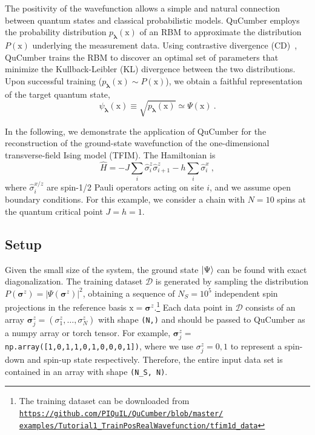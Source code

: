 \documentclass[submission, Phys, hidelnks]{SciPost}
\newcommand{\x}{\bm{\mathrm{x}}}
\begin{document}
The positivity of the wavefunction allows a simple and natural connection
between quantum states and classical probabilistic models. QuCumber employs the
probability distribution $p_{\bm{\lambda}}(\x)$ of an RBM to approximate the
distribution $P(\x)$ underlying the measurement data. Using contrastive
divergence (CD)~\cite{hinton_training_2002}, QuCumber trains the RBM to discover
an optimal set of parameters that minimize the Kullback-Leibler (KL) divergence
between the two distributions. Upon successful training
($p_{\bm{\lambda}}(\x)\sim P(\x)$), we obtain a faithful representation of
the target quantum state,
\begin{equation}\label{wfpd}
    \psi_{\bm{\lambda}}(\x) \equiv \sqrt{p_{\bm{\lambda}}(\x)}
    \simeq\Psi(\x)\:.
\end{equation}

In the following, we demonstrate the application of QuCumber for the reconstruction of the
ground-state wavefunction of the one-dimensional transverse-field Ising model
(TFIM). The Hamiltonian is
\begin{equation}
    \hat{H} = -J\sum_i \hat{\sigma}^z_i \hat{\sigma}^z_{i+1} - h \sum_i\hat{\sigma}^x_i\:, \label{TFIM}
\end{equation}
where $\hat{\sigma}^{x/z}_i$ are spin-1/2 Pauli operators acting on site $i$,
and we assume open boundary conditions. For this example, we consider a chain
with $N=10$ spins at the quantum critical point $J=h=1$.

\subsection{Setup}\label{subsec:example}
Given the small size of the system, the ground state $\ket{ \Psi}$ can be found
with exact diagonalization. The training dataset $\mathcal{D}$ is generated by
sampling the distribution $P(\bm{\sigma}^z)=|\Psi(\bm{\sigma}^z)|^2$, obtaining
a sequence of $N_S=10^5$ independent spin projections in the reference basis
$\x = \bm{\sigma}^z$.\footnote{
        The training dataset can be downloaded from
        \href{https://github.com/PIQuIL/QuCumber/blob/master/examples/Tutorial1_TrainPosRealWaveFunction/tfim1d_data.txt}{\texttt{https://github.com/PIQuIL/QuCumber/blob/master/\\examples/Tutorial1\_TrainPosRealWavefunction/tfim1d\_data}}
    }
Each data point in $\mathcal{D}$ consists of an array $\bm{\sigma}^z_j=(\sigma^z_1,\dots,\sigma^z_N)$ with shape \verb|(N,)| and should be passed to QuCumber as a numpy array or torch tensor. For example, $\bm{\sigma}^z_j=$ \verb|np.array([1,0,1,1,0,1,0,0,0,1])|, where we use $\sigma_j^z=0,1$ to represent a spin-down and spin-up state respectively. Therefore, the entire input data set is contained in an array with shape \verb|(N_S, N)|.
\end{document}
